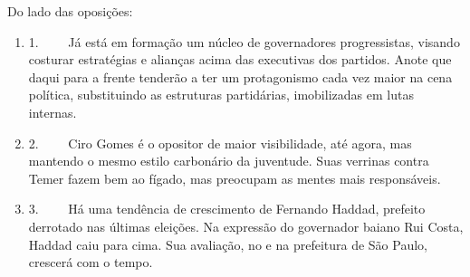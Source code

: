 Do lado das oposições:

\begin{enumerate}
\itemsep1pt\parskip0pt
\item
  1.~~~~ Já está em formação um núcleo de governadores progressistas,
  visando costurar estratégias e alianças acima das executivas dos
  partidos. Anote que daqui para a frente tenderão a ter um protagonismo
  cada vez maior na cena política, substituindo as estruturas
  partidárias, imobilizadas em lutas internas.
\item
  2.~~~~ Ciro Gomes é o opositor de maior visibilidade, até agora, mas
  mantendo o mesmo estilo carbonário da juventude. Suas verrinas contra
  Temer fazem bem ao fígado, mas preocupam as mentes mais responsáveis.
\item
  3.~~~~ Há uma tendência de crescimento de Fernando Haddad, prefeito
  derrotado nas últimas eleições. Na expressão do governador baiano Rui
  Costa, Haddad caiu para cima. Sua avaliação, no  e na prefeitura de
  São Paulo, crescerá com o tempo.
\end{enumerate}
